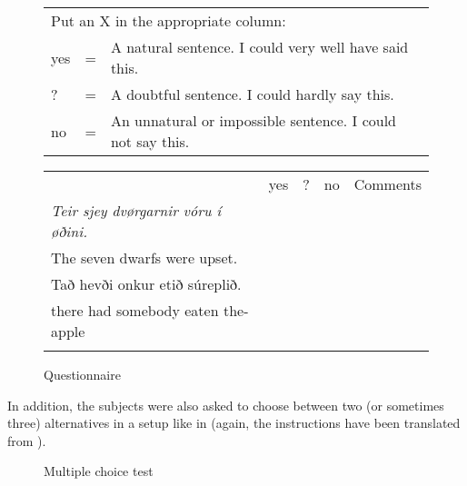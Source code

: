 \documentclass[output=paper]{LSP/langsci}
\begin{document}
\begin{figure}
\caption{Questionnaire}\label{ex:Thrainsson:8}
  \begin{tabular}[t]{lll}
  \multicolumn{3}{l}{Put an X in the appropriate column:}\\
  yes  & = & A natural sentence. I could very well have said this.\\
  ?    & = & A doubtful sentence. I could hardly say this.\\
  no   &  =&  An unnatural or impossible sentence. I could not say this.\\
  \end{tabular}
  \begin{tabular}{|l|l|l|l|l|} \hhline{-----} & yes & ? & no & Comments\\\hhline{-----}
  \textit{Teir sjey dvørgarnir vóru í øðini.} & \multicolumn{1}{c}{\cellcolor{black!25}} & \multicolumn{1}{c}{\cellcolor{black!25}} & \multicolumn{1}{l|}{\cellcolor{black!25}} & \\
  The seven dwarfs were upset. & \multicolumn{1}{c}{\cellcolor{black!25}} & \multicolumn{1}{c}{\cellcolor{black!25}} & \multicolumn{1}{l|}{\cellcolor{black!25}} & \\ \hhline{~---~}
  Tað hevði onkur etið súreplið. & & & &  \\
  there had somebody eaten the-apple & & & & \\ \hhline{-----}
  \end{tabular}
\end{figure}
In addition, the subjects were also asked to choose between two (or sometimes three) alternatives in a setup like in  (again, the instructions have been translated from ).
\begin{figure}\caption{Multiple choice test}
    \label{ex:Thrainsson:9}
\end{figure}
\end{document}

